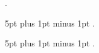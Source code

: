 {}%
{}%
{}%
{}%
{\bfseries}%
{}%
{\newline}%
{.}%

{}%
{}%
{}%
{}%
{\bfseries}%
{}%
{5pt plus 1pt minus 1pt}%
{.}%

{}%
{}%
{}%
{}%
{\bfseries}%
{}%
{5pt plus 1pt minus 1pt}%
{\label{defi:#2}.}%

\makeindex
\usepackage[totoc]{idxlayout}       %
